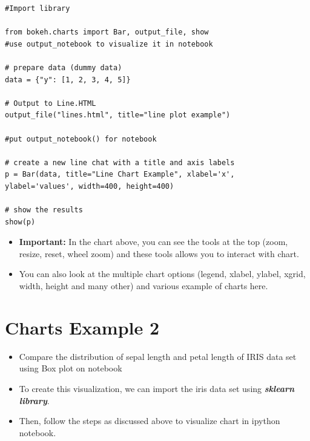 \documentclass[a4paper,12pt]{article}
\begin{document}
%
%
%
%

\newpage

\begin{verbatim}
#Import library

from bokeh.charts import Bar, output_file, show 
#use output_notebook to visualize it in notebook

# prepare data (dummy data)
data = {"y": [1, 2, 3, 4, 5]}

# Output to Line.HTML
output_file("lines.html", title="line plot example") 

#put output_notebook() for notebook

# create a new line chat with a title and axis labels
p = Bar(data, title="Line Chart Example", xlabel='x', 
ylabel='values', width=400, height=400)

# show the results
show(p)
\end{verbatim}

\newpage
\begin{itemize}
	\item \textbf{Important:} In the chart above,  you can see the tools at the top (zoom, resize, reset, wheel zoom) and these 
	tools allows you to interact with chart. 
	\item You can also look at the multiple chart options (legend, xlabel, ylabel, xgrid, width, height and many other) and 
	various example of charts here.
\end{itemize}




\section*{Charts Example 2}
\begin{itemize}
	\item Compare the distribution of sepal length and petal length of IRIS data set using 
	Box plot on notebook
	
	\item To create this visualization, we can import the iris data set using \textbf{\textit{sklearn library}}. 
	\item Then, 
	follow the steps as discussed above to visualize chart in ipython notebook.
	
\end{itemize}
\end{document}
